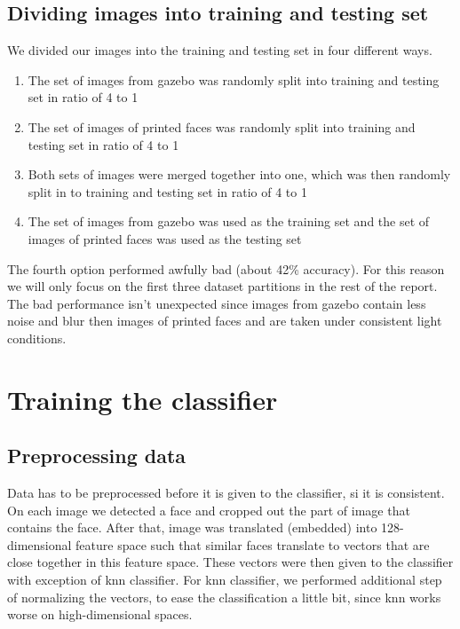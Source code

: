 \documentclass[12pt,a4paper]{article}
\begin{document}
    \subsection{Dividing images into training and testing set}

    We divided our images into the training and testing set in four different ways.

    \begin{enumerate} %
		\item The set of images from gazebo was randomly split into training and testing set in ratio of 4 to 1
		\item The set of images of printed faces was randomly split into training and testing set in ratio of 4 to 1
		\item Both sets of images were merged together into one, which was then randomly split in to training and testing set in ratio of 4 to 1
		\item The set of images from gazebo was used as the training set and the set of images of printed faces was used as the testing set
    \end{enumerate}
    
    The fourth option performed awfully bad (about 42\% accuracy). For this reason we will only focus on the first three dataset partitions in the rest of the report. The bad performance isn't unexpected since images from gazebo contain less noise and blur then images of printed faces and are taken under consistent light conditions.

    \section{Training the classifier}

    \subsection{Preprocessing data}

    Data has to be preprocessed before it is given to the classifier, si it is consistent. On each image we detected a face and cropped out the part of image that contains the face. After that, image was translated (embedded) into 128-dimensional feature space such that similar faces translate to vectors that are close together in this feature space. These vectors were then given to the classifier with exception of knn classifier. For knn classifier, we performed additional step of normalizing the vectors, to ease the classification a little bit, since knn works worse on high-dimensional spaces.
\end{document}
